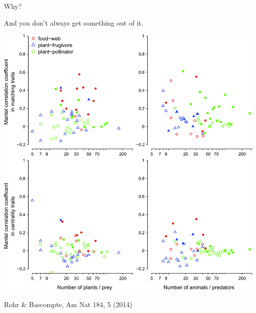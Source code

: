 \documentclass[]{beamer}
\begin{document}
\begin{frame}{Why?}

\centering
And you don't always get something out of it.

\centering
\includegraphics[height=0.7 \textheight]{images/rohr.jpg}

\centering
{\tiny Rohr \& Bascompte, Am Nat 184, 5 (2014)}


\end{frame}
\end{document}
